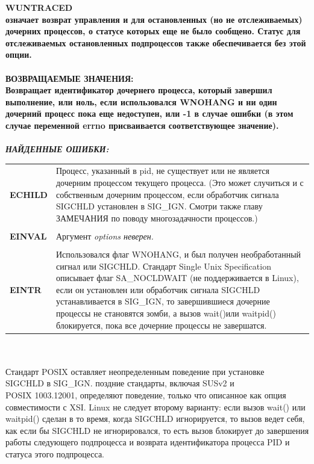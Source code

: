\documentclass[a4paper]{article}
\begin{document}
\bf WUNTRACED\\
\rm означает возврат управления и для остановленных (но не отслеживаемых) дочерних процессов, о статусе которых еще не было сообщено. Статус для отслеживаемых остановленных подпроцессов также обеспечивается без этой опции.\\\\
ВОЗВРАЩАЕМЫЕ ЗНАЧЕНИЯ:\\
Возвращает идентификатор дочернего процесса, который завершил выполнение, или ноль, если использовался WNOHANG и ни один дочерний процесс пока еще недоступен, или -1 в случае ошибки (в этом случае переменной errno присваивается соответствующее значение).\\\\
\sl НАЙДЕННЫЕ ОШИБКИ:\\
\begin{tabular}{p{2cm}p{13cm}}
  \bf ECHILD & \rm Процесс, указанный в pid, не существует или не является дочерним процессом текущего процесса. (Это может случиться и с собственным дочерним процессом, если обработчик сигнала SIGCHLD установлен в SIG\_IGN. Смотри также главу ЗАМЕЧАНИЯ по поводу многозадачности процессов.) \\\\
  \bf EINVAL & \rm Аргумент \sl options \rm неверен.\\\\
  \bf EINTR & \rm Использовался флаг WNOHANG, и был получен необработанный сигнал или SIGCHLD. Стандарт Single Unix Specification описывает флаг SA\_NOCLDWAIT (не поддерживается в Linux), если он установлен или обработчик сигнала SIGCHLD устанавливается в SIG\_IGN, то завершившиеся дочерние процессы не становятся зомби, а вызов wait()или waitpid() блокируется, пока все дочерние процессы не завершатся.
\end{tabular}
\\\\
\rm
Стандарт POSIX оставляет неопределенным поведение при установке \\SIGCHLD в SIG\_IGN. поздние стандарты, включая SUSv2 и 
\\ POSIX 1003.12001, определяют поведение, только что описанное как опция совместимости с XSI. Linux не следует второму варианту: если вызов wait() или waitpid() сделан в то время, когда SIGCHLD игнорируется, то вызов ведет себя, как если бы SIGCHLD не игнорировался, то есть вызов блокирует до завершения работы следующего подпроцесса и возврата идентификатора процесса PID и статуса этого подпроцесса.
\end{document}
